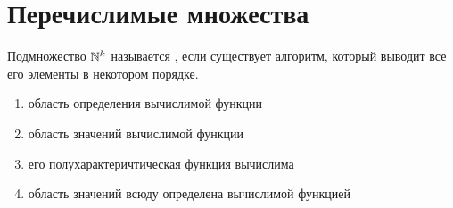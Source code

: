\section{Перечислимые множества}

\begin{defn}[]
	Подмножество $ \mathbb{N}^{k}$ называется , если существует алгоритм, который выводит все его элементы в некотором порядке.
\end{defn}

\begin{thm}
	\begin{enumerate}
	    \item область определения вычислимой функции
		\item область значений вычислимой функции
		\item его полухарактеричтическая функция вычислима
		\item область значений  всюду определена вычислимой функцией
	\end{enumerate} 
\end{thm}
